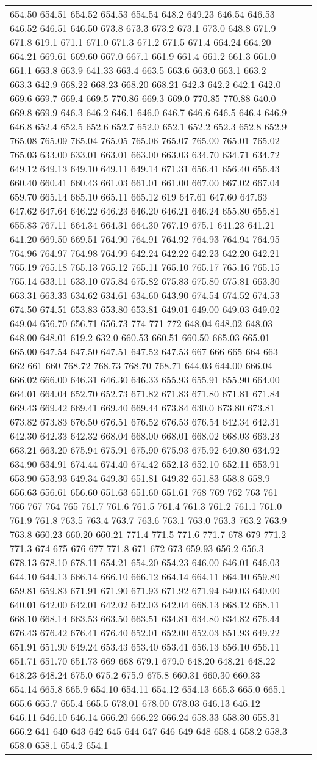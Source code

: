\begin{longtable}{|R{.05in}|L{.65in}||L{5.65in}|}
654.50 654.51 654.52 654.53 654.54 648.2 649.23 646.54 646.53 646.52 646.51 646.50 673.8 673.3 673.2 673.1 673.0 648.8 671.9 671.8 619.1 671.1 671.0 671.3 671.2 671.5 671.4 664.24 664.20 664.21 669.61 669.60 667.0 667.1 661.9 661.4 661.2 661.3 661.0 661.1 663.8 663.9 641.33 663.4 663.5 663.6 663.0 663.1 663.2 663.3 642.9 668.22 668.23 668.20 668.21 642.3 642.2 642.1 642.0 669.6 669.7 669.4 669.5 770.86 669.3 669.0 770.85 770.88 640.0 669.8 669.9 646.3 646.2 646.1 646.0 646.7 646.6 646.5 646.4 646.9 646.8 652.4 652.5 652.6 652.7 652.0 652.1 652.2 652.3 652.8 652.9 765.08 765.09 765.04 765.05 765.06 765.07 765.00 765.01 765.02 765.03 633.00 633.01 663.01 663.00 663.03 634.70 634.71 634.72 649.12 649.13 649.10 649.11 649.14 671.31 656.41 656.40 656.43 660.40 660.41 660.43 661.03 661.01 661.00 667.00 667.02 667.04 659.70 665.14 665.10 665.11 665.12 619 647.61 647.60 647.63 647.62 647.64 646.22 646.23 646.20 646.21 646.24 655.80 655.81 655.83 767.11 664.34 664.31 664.30 767.19 675.1 641.23 641.21 641.20 669.50 669.51 764.90 764.91 764.92 764.93 764.94 764.95 764.96 764.97 764.98 764.99 642.24 642.22 642.23 642.20 642.21 765.19 765.18 765.13 765.12 765.11 765.10 765.17 765.16 765.15 765.14 633.11 633.10 675.84 675.82 675.83 675.80 675.81 663.30 663.31 663.33 634.62 634.61 634.60 643.90 674.54 674.52 674.53 674.50 674.51 653.83 653.80 653.81 649.01 649.00 649.03 649.02 649.04 656.70 656.71 656.73 774 771 772 648.04 648.02 648.03 648.00 648.01 619.2 632.0 660.53 660.51 660.50 665.03 665.01 665.00 647.54 647.50 647.51 647.52 647.53 667 666 665 664 663 662 661 660 768.72 768.73 768.70 768.71 644.03 644.00 666.04 666.02 666.00 646.31 646.30 646.33 655.93 655.91 655.90 664.00 664.01 664.04 652.70 652.73 671.82 671.83 671.80 671.81 671.84 669.43 669.42 669.41 669.40 669.44 673.84 630.0 673.80 673.81 673.82 673.83 676.50 676.51 676.52 676.53 676.54 642.34 642.31 642.30 642.33 642.32 668.04 668.00 668.01 668.02 668.03 663.23 663.21 663.20 675.94 675.91 675.90 675.93 675.92 640.80 634.92 634.90 634.91 674.44 674.40 674.42 652.13 652.10 652.11 653.91 653.90 653.93 649.34 649.30 651.81 649.32 651.83 658.8 658.9 656.63 656.61 656.60 651.63 651.60 651.61 768 769 762 763 761 766 767 764 765 761.7 761.6 761.5 761.4 761.3 761.2 761.1 761.0 761.9 761.8 763.5 763.4 763.7 763.6 763.1 763.0 763.3 763.2 763.9 763.8 660.23 660.20 660.21 771.4 771.5 771.6 771.7 678 679 771.2 771.3 674 675 676 677 771.8 671 672 673 659.93 656.2 656.3 678.13 678.10 678.11 654.21 654.20 654.23 646.00 646.01 646.03 644.10 644.13 666.14 666.10 666.12 664.14 664.11 664.10 659.80 659.81 659.83 671.91 671.90 671.93 671.92 671.94 640.03 640.00 640.01 642.00 642.01 642.02 642.03 642.04 668.13 668.12 668.11 668.10 668.14 663.53 663.50 663.51 634.81 634.80 634.82 676.44 676.43 676.42 676.41 676.40 652.01 652.00 652.03 651.93 649.22 651.91 651.90 649.24 653.43 653.40 653.41 656.13 656.10 656.11 651.71 651.70 651.73 669 668 679.1 679.0 648.20 648.21 648.22 648.23 648.24 675.0 675.2 675.9 675.8 660.31 660.30 660.33 654.14 665.8 665.9 654.10 654.11 654.12 654.13 665.3 665.0 665.1 665.6 665.7 665.4 665.5 678.01 678.00 678.03 646.13 646.12 646.11 646.10 646.14 666.20 666.22 666.24 658.33 658.30 658.31 666.2 641 640 643 642 645 644 647 646 649 648 658.4 658.2 658.3 658.0 658.1 654.2 654.1 
\end{longtable}
